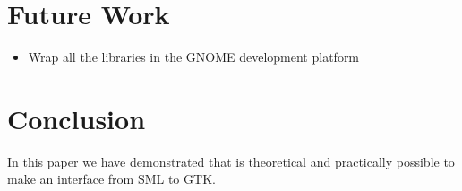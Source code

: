 \documentclass[workingdraft,endnotes]{usetex-v1}
\begin{document}
\section{Future Work}
\label{sec:future-work}

\begin{itemize}
\item Wrap all the libraries in the GNOME development platform
\end{itemize}



\section{Conclusion}
\label{sec:conclusion}

In this paper we have demonstrated that is theoretical and practically
possible to make an interface from SML to GTK.



\end{document}
